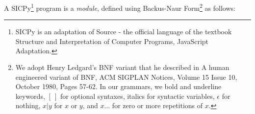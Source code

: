 A SICPy\footnote{SICPy is an adaptation of Source - the official language of the textbook Structure and Interpretation of Computer Programs, JavaScript Adaptation.} program is a \textit{module}, defined using Backus-Naur Form\footnote{We adopt Henry Ledgard’s BNF variant that he described in A human engineered variant of BNF, ACM SIGPLAN Notices, Volume 15 Issue 10, October 1980, Pages 57-62. In our grammars, we bold and underline keywords, $[ \ ]$ for optional syntaxes, italics for syntactic variables, $\epsilon$ for nothing, $x | y$ for $x$ or $y$, and $x . . .$ for zero or more repetitions of $x$.} as follows:



